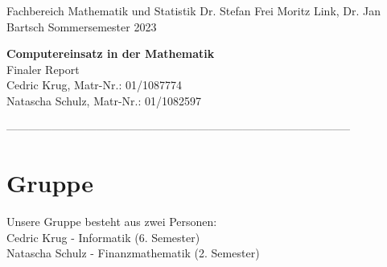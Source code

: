 \documentclass[12pt]{scrartcl} %
\newenvironment{Lösung}{\noindent\textbf{Lösung: }}{\hfill $\Box$}
\begin{document}
\begin{minipage}[t]{0.49\textwidth}
	\noindent 
	Fachbereich Mathematik und Statistik
	\vspace{0.5ex} \newline
	Dr. Stefan Frei
	\vspace{0.5ex} \newline
	Moritz Link, Dr. Jan Bartsch
	\vspace{0.5ex} \newline
	Sommersemester 2023
	\vspace{1ex} \newline
\end{minipage}


\begin{center}
 {\Large{\textbf{Computereinsatz in der Mathematik}}}
  \vspace{1.5ex} \\
  Finaler Report
 \vspace{1.5ex} \\
 Cedric Krug, Matr-Nr.: 01/1087774 \\
 Natascha Schulz, Matr-Nr.: 01/1082597\\
 \vspace{1.5ex}
\end{center}


%
%
%
%
%

--------------------------------------------------------------------------------------------
%
%
\\[0.2cm]
%
\section{Gruppe}
Unsere Gruppe besteht aus zwei Personen:\\
Cedric Krug - Informatik (6. Semester)\\
Natascha Schulz - Finanzmathematik (2. Semester)
\end{document}
